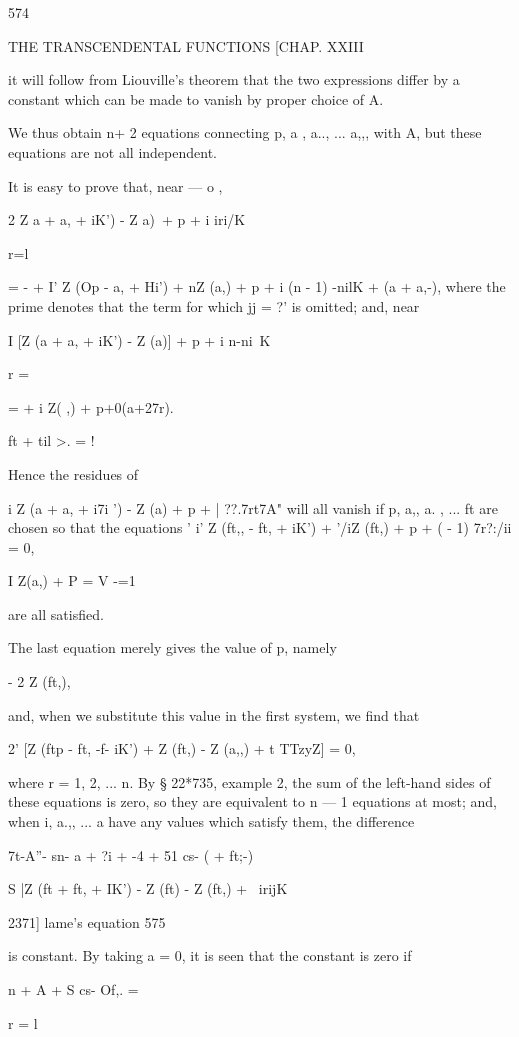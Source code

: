 {{{{{{{{574

THE TRANSCENDENTAL FUNCTIONS [CHAP. XXIII

it will follow from Liouville's theorem that the two expressions
differ by a constant which can be made to vanish by proper choice of
A.

We thus obtain n+ 2 equations connecting p, a , a.., ... a,,, with A,
but these equations are not all independent.

It is easy to prove that, near — o ,

2 Z a + a, + iK') - Z a)\ + p + i iri/K

r=l

= - + I' Z (Op - a, + Hi') + nZ (a,) + p + i (n - 1) -nilK + (a +
a,-), where the prime denotes that the term for which jj = ?' is
omitted; and, near

I [Z (a + a, + iK') - Z (a)] + p + i n-ni\ K

r = \

= + i Z( ,) + p+0(a+27r).

ft + til >. = !

Hence the residues of

i Z (a + a, + i7i ') - Z (a) + p + | ??.7rt7A" will all vanish if p,
a,, a. , ... ft are chosen so that the equations ' i' Z (ft,, - ft, +
iK') + '/iZ (ft,) + p + ( - 1) 7r?:/ii = 0,

I Z(a,) + P = V -=1

are all satisfied.

The last equation merely gives the value of p, namely

- 2 Z (ft,),

and, when we substitute this value in the first system, we find that

2' [Z (ftp - ft, -f- iK') + Z (ft,) - Z (a,,) + t TTzyZ] = 0,

where r = 1, 2, ... n. By § 22*735, example 2, the sum of the
left-hand sides of these equations is zero, so they are equivalent to
n — 1 equations at most; and, when i, a.,, ... a have any values
which satisfy them, the difference

7t-A''- sn- a + ?i + -4 + 51 cs- ( + ft;-)

S |Z (ft + ft, + IK') - Z (ft) - Z (ft,) + \ irijK\

2371] lame's equation 575

is constant. By taking a = 0, it is seen that the constant is zero if

n + A + S cs- Of,. =

r = l

}}}}}}}}
